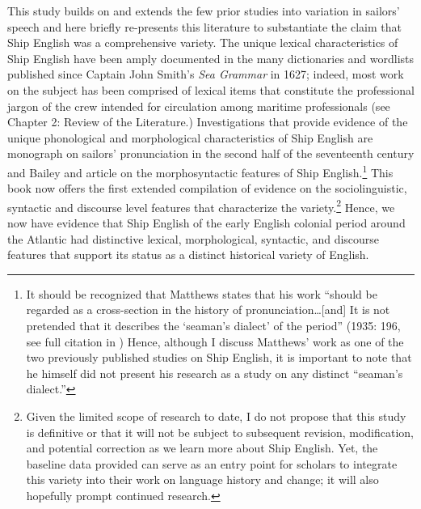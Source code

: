   This study builds on and extends the few prior studies into variation in sailors’ speech and here briefly re-presents this literature to substantiate the claim that Ship English was a comprehensive variety. The unique lexical characteristics of Ship English have been amply documented in the many dictionaries and wordlists published since Captain John Smith’s \textit{Sea Grammar} in 1627; indeed, most work on the subject has been comprised of lexical items that constitute the professional jargon of the crew intended for circulation among maritime professionals (see Chapter 2: Review of the Literature.) Investigations that provide evidence of the unique phonological and morphological characteristics of Ship English are  monograph on sailors’ pronunciation in the second half of the seventeenth century and Bailey and  article on the morphosyntactic features of Ship English.\footnote{It should be recognized that Matthews states that his work “should be regarded as a cross-section in the history of pronunciation…[and] It is not pretended that it describes the ‘seaman’s dialect’ of the period” (1935: 196, see full citation in ) Hence, although I discuss Matthews’ work as one of the two previously published studies on Ship English, it is important to note that he himself did not present his research as a study on any distinct “seaman’s dialect.”}  This book now offers the first extended compilation of evidence on the sociolinguistic, syntactic and discourse level features that characterize the variety.\footnote{Given the limited scope of research to date, I do not propose that this study is definitive or that it will not be subject to subsequent revision, modification, and potential correction as we learn more about Ship English. Yet, the baseline data provided can serve as an entry point for scholars to integrate this variety into their work on language history and change; it will also hopefully prompt continued research.}  Hence, we now have evidence that Ship English of the early English colonial period around the Atlantic had distinctive lexical, morphological, syntactic, and discourse features that support its status as a distinct historical variety of English. 

